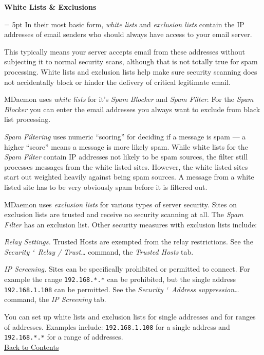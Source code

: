 \documentclass[10pt]{article}
\def\gt{\char`\>}
\begin{document}
\begin{minipage}[t]{.66\linewidth}
\begin{center}
\hypertarget{whitelists}{\textbf{{\Large White Lists \& Exclusions}}}
\end{center}

\begin{multicols}{2}
\parskip = 5pt
In their most basic form, \textsl{white lists} and \textsl{exclusion lists} contain the IP addresses of email senders who should always have access to your email server. 

This typically means your server accepts email from these addresses without subjecting it to normal security scans, although that is not totally true for spam processing. White lists and exclusion lists help make sure security scanning does not accidentally block or hinder the delivery of critical legitimate email. 

MDaemon uses \textsl{white lists} for it's \textsl{Spam Blocker} and \textsl{Spam Filter}. For the \textsl{Spam Blocker} you can enter the email addresses you always want to exclude from black list processing. 

\textsl{Spam Filtering} uses numeric ``scoring'' for deciding if a message is spam --- a higher ``score'' means a message is more likely spam. While white lists for the \textsl{Spam Filter} contain IP addresses not likely to be spam sources, the filter still processes messages from the white listed sites. However, the white listed sites start out weighted heavily against being spam sources. A message from a white listed site has to be very obviously spam before it is filtered out.

MDaemon uses \textsl{exclusion lists} for various types of server security. Sites on exclusion lists are trusted and receive no security scanning at all.  The \textsl{Spam Filter} has an exclusion list. Other security measures with exclusion lists include:

\textsl{Relay Settings.} Trusted Hosts are exempted from the relay restrictions. See the \textsl{Security \gt\ Relay / Trust\dots} command, the \textsl{Trusted Hosts} tab.

\textsl{IP Screening.} Sites can be specifically prohibited or permitted to connect. For example the range \texttt{192.168.*.*}  can be prohibited, but the single address \texttt{192.168.1.108} can be permitted. See the \textsl{Security \gt\ Address suppression\dots} command, the \textsl{IP Screening} tab.

You can set up white lists and exclusion lists for single addresses and for ranges of addresses. Examples include: \texttt{192.168.1.108} for a single address and \texttt{192.168.*.*} for a range of addresses.\\
\hyperlink{contents}{{\small Back to Contents}}
\end{multicols}


\end{minipage}
\end{document}
